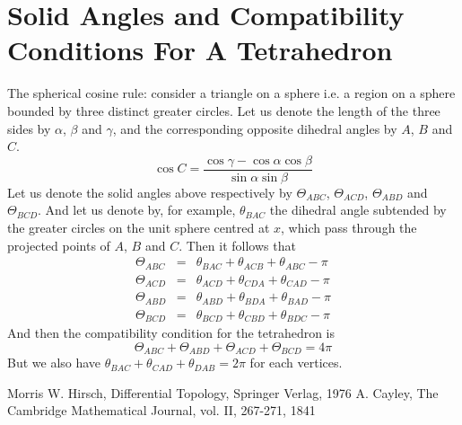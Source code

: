 \documentclass{article}
\begin{document}
\section{Solid Angles and Compatibility Conditions For A Tetrahedron}
\label{sec-6}
The spherical cosine rule:
consider a triangle on a sphere i.e. a region on a sphere bounded by three distinct greater circles. Let us denote the length of the three sides by $\alpha$, $\beta$ and $\gamma$, and the corresponding opposite dihedral angles by $A$, $B$ and $C$.
\begin{equation}
\label{ }
\cos{C} = \frac{\cos{\gamma} - \cos{\alpha}\cos{\beta} }{\sin{\alpha}\sin{\beta}}
\end{equation}
Let us denote the solid angles above respectively by $\Theta_{ABC}$, $\Theta_{ACD}$, $\Theta_{ABD}$ and $\Theta_{BCD}$. And let us denote by, for example, $\theta_{BAC}$ the dihedral angle subtended by the greater circles on the unit sphere centred at $x$, which pass through the projected points of $A$, $B$ and $C$. Then it follows that 
\begin{eqnarray}
\Theta_{ABC} & = & \theta_{BAC} + \theta_{ACB} + \theta_{ABC} - \pi \\
\Theta_{ACD} & = & \theta_{ACD} + \theta_{CDA} + \theta_{CAD} - \pi \\
\Theta_{ABD} & = & \theta_{ABD} + \theta_{BDA} + \theta_{BAD} - \pi \\
\Theta_{BCD} & = & \theta_{BCD} + \theta_{CBD} + \theta_{BDC} - \pi 
\end{eqnarray}
And then the compatibility condition for the tetrahedron is
\begin{equation}
\label{ }
\Theta_{ABC} + \Theta_{ABD} + \Theta_{ACD} + \Theta_{BCD} = 4\pi
\end{equation}
But we also have $\theta_{BAC} + \theta_{CAD} + \theta_{DAB} = 2\pi$ for each vertices.
\begin{thebibliography}{10}
  Morris W. Hirsch, Differential Topology, Springer Verlag, 1976
  A. Cayley, The Cambridge Mathematical Journal, vol. II, 267-271, 1841
\end{thebibliography}
\end{document}
